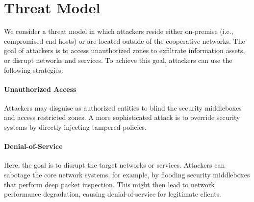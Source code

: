 \section{Threat Model}
\label{sec:threatmodel}
We consider a threat model in which attackers reside either on-premise (i.e., compromised 
end hosts) or are located
outside of the cooperative networks. The goal of attackers is to access unauthorized zones 
to exfiltrate information assets, or disrupt networks and services. To achieve this goal, 
attackers can use the following strategies:


\paragraph{Unauthorized Access}
Attackers may disguise as authorized entities to blind the security middleboxes and
access restricted zones. 
A more sophisticated attack is to override security systems by directly injecting 
tampered policies.

\paragraph{Denial-of-Service}
Here, the goal is to disrupt the target networks or services. Attackers can sabotage the core network 
systems, for example, by flooding security middleboxes that perform deep packet inspection.
This might then lead to network performance degradation, causing 
denial-of-service for legitimate clients.


